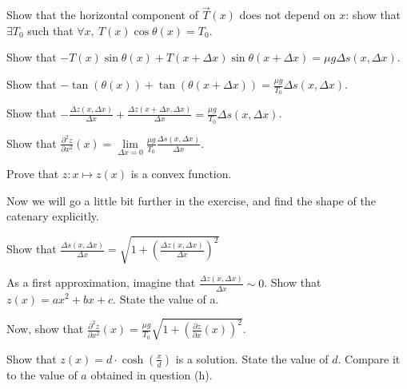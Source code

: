 \begin{enumerate}
    \qitem Show that the horizontal component of $\overrightarrow{T}(x)$ does not depend on $x$: show that $\exists T_0$ such that $\forall x,\ T(x)\cos{\theta (x)}=T_0$.
    
    \sol{}
    \qitem Show that $-T(x)\sin{\theta (x)}+T(x+\Delta x)\sin{\theta (x+\Delta x)}=\mu g \Delta s(x,\Delta x)$.
    
    \sol{
    }
    \qitem Show that $- \tan{(\theta (x))} + \tan{(\theta (x+\Delta x))} = \frac{\mu g}{T_0} \Delta s(x,\Delta x)$.
    
    \sol{
    }
    \qitem Show that $-\frac{\Delta z(x, \Delta x)}{\Delta x} + \frac{\Delta z(x+\Delta x, \Delta x)}{\Delta x} = \frac{\mu g}{T_0} \Delta s(x,\Delta x)$.
    
    \sol{}
    
    \qitem Show that $\frac{\partial^2 z}{\partial x^2}(x) = \lim\limits_{\Delta x = 0} \frac{\mu g}{T_0} \frac{\Delta s(x,\Delta x)}{\Delta x}$.
    
    \sol{
    }
    
    \qitem Prove that $z:x\mapsto z(x)$ is a convex function.
    
    \sol{
    }
\end{enumerate}

Now we will go a little bit further in the exercise, and find the shape of the catenary explicitly.

\begin{enumerate}
    \setcounter{enumi}{6}
    \qitem Show that $\frac{\Delta s(x,\Delta x)}{\Delta x} = \sqrt{1+\left(\frac{\Delta z (x, \Delta x)}{\Delta x}\right)^2}$
    
    \sol{}
    \qitem As a first approximation, imagine that $\frac{\Delta z (x, \Delta x)}{\Delta x} \sim 0$. Show that $z(x) = ax^2+bx+c$. State the value of a.
    
    \sol{}
    \qitem Now, show that  $\frac{\partial^2 z}{\partial x^2}(x) = 
    \frac{\mu g}{T_0} \sqrt{1+\left(\frac{\partial z}{\partial x}(x)\right)^2}$.
    
    \sol{}
    
    \qitem Show that $z(x) = d\cdot \cosh{(\frac{x}{d})}$ is a solution. State the value of $d$. Compare it to the value of $a$ obtained in question (h).
    
    \sol{
    }
\end{enumerate}

